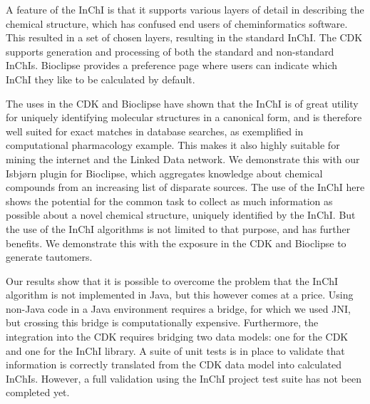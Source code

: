 \documentclass[10pt]{bmc_article}
\newenvironment{bmcformat}{\fussy\setboolean{publ}{true}}{\fussy}
\begin{document}
\begin{bmcformat}
A feature of the InChI is that it supports various layers of detail in describing the chemical structure,
which has confused end users of cheminformatics software. This resulted in a set of chosen layers, resulting
in the standard InChI. The CDK supports generation and processing of both the standard and non-standard InChIs.
Bioclipse provides a preference page where users can indicate which InChI they like to be calculated by
default.

The uses in the CDK and Bioclipse have shown that the InChI is of great utility for uniquely identifying
molecular structures in a canonical form, and is therefore well suited for exact matches in database searches, 
as exemplified in computational pharmacology example. This makes it also highly suitable for mining the
internet and the Linked Data network. We demonstrate this with our Isbjørn plugin for Bioclipse, which
aggregates knowledge about chemical compounds from an increasing list of disparate sources. The use of the
InChI here shows the potential for the common task to collect as much information as possible about a
novel chemical structure, uniquely identified by the InChI. But the use of the InChI algorithms is not limited to
that purpose, and has further benefits. We demonstrate this with the exposure in the CDK and Bioclipse to
generate tautomers. 

Our results show that it is possible to overcome the problem that the InChI algorithm is not implemented
in Java, but this however comes at a price. Using non-Java code in a Java environment requires a bridge, for which
we used JNI, but crossing this bridge is computationally expensive. Furthermore, the integration into the
CDK requires bridging two data models: one for the CDK and one for the InChI library. A suite of unit
tests is in place to validate that information is correctly translated from the CDK data model into
calculated InChIs. However, a full validation using the InChI project test suite has not been completed
yet.




\end{bmcformat}
\end{document}
